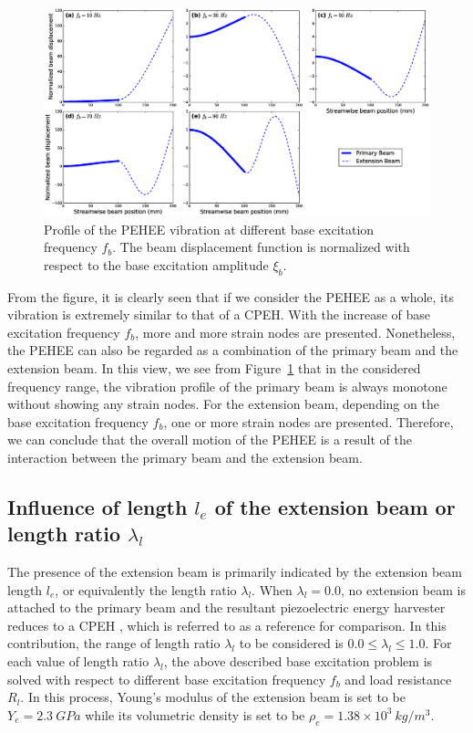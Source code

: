 \documentclass{elsarticle}
\begin{document}
\begin{figure}[!htbp]
    \centering
    \includegraphics[width=\textwidth]{./fig_vibration_profile_vs_fr_Rl_laml_all}
    \caption{Profile of the PEHEE vibration at different base excitation frequency $f_b$. The beam displacement function is normalized with respect to the base excitation amplitude $\xi_b$. }
    \label{fig:fig_vibration_profile_vs_fr_Rl_laml_all}
\end{figure}

From the figure, it is clearly seen that if we consider the PEHEE as a whole, its vibration is extremely similar to that of a CPEH. \cite{erturk2009effect} With the increase of base excitation frequency $f_b$, more and more strain nodes are presented. Nonetheless, the PEHEE can also be regarded as a combination of the primary beam and the extension beam. In this view, we see from Figure~\ref{fig:fig_vibration_profile_vs_fr_Rl_laml_all} that in the considered frequency range, the vibration profile of the primary beam is always monotone without showing any strain nodes. For the extension beam, depending on the base excitation frequency $f_b$, one or more strain nodes are presented. Therefore, we can conclude that the overall motion of the PEHEE is a result of the interaction between the primary beam and the extension beam. 

\subsection{Influence of length $l_e$ of the extension beam or length ratio $\lambda_l$}

The presence of the extension beam is primarily indicated by the extension beam length $l_e$, or equivalently the length ratio $\lambda_l$. When $\lambda_l = 0.0$, no extension beam is attached to the primary beam and the resultant piezoelectric energy harvester reduces to a CPEH \cite{erturk2009experimentally}, which is referred to as a reference for comparison. In this contribution, the range of length ratio $\lambda_l$ to be considered is $0.0 \leq \lambda_l \leq 1.0$. For each value of length ratio $\lambda_l$, the above described base excitation problem is solved with respect to different base excitation frequency $f_b$ and load resistance $R_l$. In this process, Young's modulus of the extension beam is set to be $Y_e = 2.3\ GPa$ while its volumetric density is set to be $\rho_e = 1.38\times10^3\ kg/m^3$.
\end{document}
